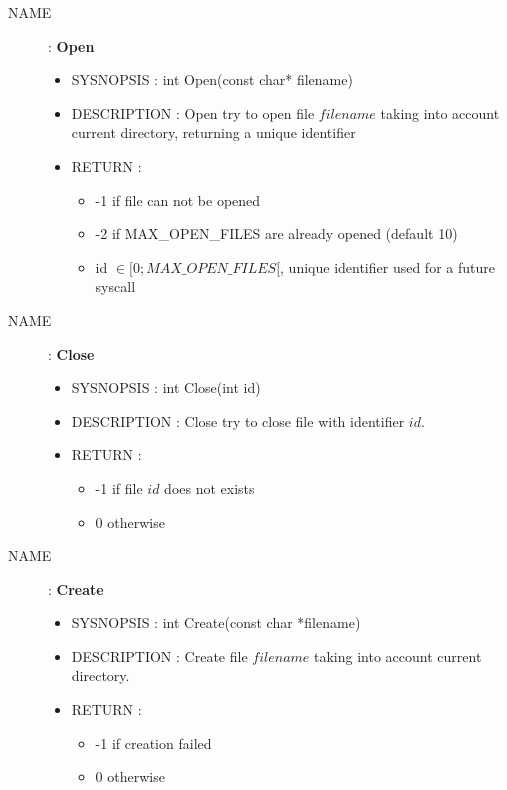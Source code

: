 \begin{description}
    \item [NAME] : \textbf{Open}
        \begin{itemize}
            \item SYSNOPSIS : int Open(const char* filename)
            \item DESCRIPTION :
                Open try to open file $filename$ taking into account current directory,
                returning a unique identifier
            \item RETURN :
                \begin{itemize}
                    \item -1 if file can not be opened
                    \item -2 if MAX\_OPEN\_FILES are already opened (default 10)
                    \item id $\in [0; MAX\_OPEN\_FILES[$, unique identifier used
                      for a future syscall
                        \end{itemize}
                \end{itemize}

            \item [NAME] : \textbf{Close}
                \begin{itemize}
                    \item SYSNOPSIS : int Close(int id)
                    \item DESCRIPTION :
                        Close try to close file with identifier $id$.
                    \item RETURN :
                        \begin{itemize}
                            \item -1 if file $id$ does not exists
                            \item 0 otherwise
                        \end{itemize}
                \end{itemize}

            \item [NAME] : \textbf{Create}
                \begin{itemize}
                    \item SYSNOPSIS : int Create(const char *filename)
                    \item DESCRIPTION :
                        Create file $filename$ taking into account current directory.
                    \item RETURN :
                        \begin{itemize}
                            \item -1 if creation failed
                            \item 0 otherwise
                        \end{itemize}
                \end{itemize}


\end{description}
